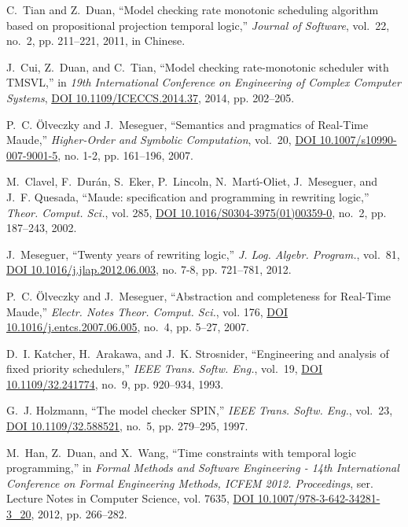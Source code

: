 \documentclass[journal]{IEEEtranTIE}
\begin{document}
\begin{thebibliography}{10}
C.~Tian and Z.~Duan, ``Model checking rate monotonic scheduling algorithm based
  on propositional projection temporal logic,'' \emph{Journal of Software},
  vol.~22, no.~2, pp. 211--221, 2011, in {Chinese}.

J.~Cui, Z.~Duan, and C.~Tian, ``Model checking rate-monotonic scheduler with
  {TMSVL},'' in \emph{19th International Conference on Engineering of Complex
  Computer Systems}, \href{http://dx.doi.org/10.1109/ICECCS.2014.37}{DOI
  10.1109/ICECCS.2014.37}, 2014, pp. 202--205.

P.~C. {\"{O}}lveczky and J.~Meseguer, ``Semantics and pragmatics of {Real-Time
  Maude},'' \emph{Higher-Order and Symbolic Computation}, vol.~20,
  \href{http://dx.doi.org/10.1007/s10990-007-9001-5}{DOI
  10.1007/s10990-007-9001-5}, no. 1-2, pp. 161--196, 2007.

M.~Clavel, F.~Dur{\'{a}}n, S.~Eker, P.~Lincoln, N.~Mart{\'{\i}}{-}Oliet,
  J.~Meseguer, and J.~F. Quesada, ``Maude: specification and programming in
  rewriting logic,'' \emph{Theor. Comput. Sci.}, vol. 285,
  \href{http://dx.doi.org/10.1016/S0304-3975(01)00359-0}{DOI
  10.1016/S0304-3975(01)00359-0}, no.~2, pp. 187--243, 2002.

J.~Meseguer, ``Twenty years of rewriting logic,'' \emph{J. Log. Algebr.
  Program.}, vol.~81, \href{http://dx.doi.org/10.1016/j.jlap.2012.06.003}{DOI
  10.1016/j.jlap.2012.06.003}, no. 7-8, pp. 721--781, 2012.

P.~C. {\"{O}}lveczky and J.~Meseguer, ``Abstraction and completeness for
  {Real-Time Maude},'' \emph{Electr. Notes Theor. Comput. Sci.}, vol. 176,
  \href{http://dx.doi.org/10.1016/j.entcs.2007.06.005}{DOI
  10.1016/j.entcs.2007.06.005}, no.~4, pp. 5--27, 2007.

D.~I. Katcher, H.~Arakawa, and J.~K. Strosnider, ``Engineering and analysis of
  fixed priority schedulers,'' \emph{{IEEE} Trans. Softw. Eng.}, vol.~19,
  \href{http://dx.doi.org/10.1109/32.241774}{DOI 10.1109/32.241774}, no.~9, pp.
  920--934, 1993.

G.~J. Holzmann, ``The model checker {SPIN},'' \emph{{IEEE} Trans. Softw. Eng.},
  vol.~23, \href{http://dx.doi.org/10.1109/32.588521}{DOI 10.1109/32.588521},
  no.~5, pp. 279--295, 1997.

M.~Han, Z.~Duan, and X.~Wang, ``Time constraints with temporal logic
  programming,'' in \emph{Formal Methods and Software Engineering - 14th
  International Conference on Formal Engineering Methods, {ICFEM} 2012.
  Proceedings}, ser. Lecture Notes in Computer Science, vol. 7635,
  \href{http://dx.doi.org/10.1007/978-3-642-34281-3\_20}{DOI
  10.1007/978-3-642-34281-3\_20}, 2012, pp. 266--282.

\end{thebibliography}\
\end{document}
